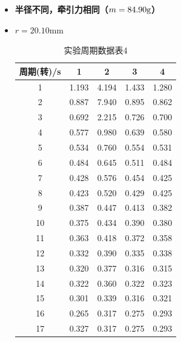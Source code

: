 \documentclass[12pt,hyperref,a4paper,UTF8]{ctexart}
\begin{document}
\begin{itemize}
        \item \textbf{半径不同，牵引力相同（$ m=84.90\text g $）}
            \item $r=20.10\text{mm}$
                \begin{table}[H]
                    \centering
                    \begin{tabular}{ccccc}
                    \toprule
                    \textbf{周期(转)/s} & \textbf{1} & \textbf{2} & \textbf{3} & \textbf{4} \\
                    \midrule
                    1  & 1.193 & 4.194 & 1.433 & 1.280 \\
                    2  & 0.887 & 7.940 & 0.895 & 0.862 \\
                    3  & 0.692 & 2.215 & 0.726 & 0.700 \\
                    4  & 0.577 & 0.980 & 0.639 & 0.580 \\
                    5  & 0.534 & 0.760 & 0.554 & 0.531 \\
                    6  & 0.484 & 0.645 & 0.511 & 0.484 \\
                    7  & 0.428 & 0.576 & 0.454 & 0.425 \\
                    8  & 0.423 & 0.520 & 0.429 & 0.425 \\
                    9  & 0.387 & 0.447 & 0.413 & 0.382 \\
                    10 & 0.375 & 0.434 & 0.390 & 0.380 \\
                    11 & 0.363 & 0.418 & 0.372 & 0.358 \\
                    12 & 0.332 & 0.390 & 0.335 & 0.338 \\
                    13 & 0.320 & 0.377 & 0.316 & 0.315 \\
                    14 & 0.322 & 0.360 & 0.322 & 0.323 \\
                    15 & 0.301 & 0.339 & 0.316 & 0.321 \\
                    16 & 0.265 & 0.317 & 0.275 & 0.293 \\
                    17 & 0.327 & 0.317 & 0.275 & 0.293 \\
                    \bottomrule
                    \end{tabular}
                    \caption{实验周期数据表4}
                    \end{table}
                    

\end{itemize}
\end{document}
